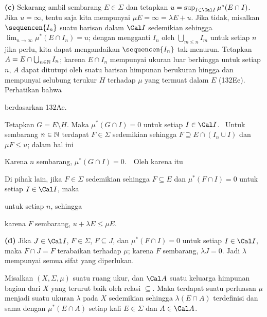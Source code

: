 {\medskip

{\bf (c)} Sekarang ambil sembarang $E\in\Sigma$ dan tetapkan
$u=\sup_{I\in\Cal I}\mu^*(E\cap I)$.   Jika $u=\infty$, tentu saja kita
mempunyai $\mu E=\infty=\lambda E+u$. Jika tidak, misalkan
$\sequencen{I_n}$ suatu barisan dalam $\Cal I$ sedemikian sehingga
$\lim_{n\to\infty}\mu^*(E\cap I_n)=u$; dengan mengganti $I_n$ oleh
$\bigcup_{m\le n}I_m$ untuk setiap $n$ jika perlu, kita dapat mengandaikan
$\sequencen{I_n}$ tak-menurun.   Tetapkan
$A=E\cap\bigcup_{n\in\Bbb N}I_n$; karena $E\cap I_n$ mempunyai ukuran
luar berhingga untuk setiap $n$, $A$ dapat ditutupi oleh suatu barisan
himpunan berukuran hingga dan mempunyai selubung terukur $H$ terhadap
$\mu$ yang termuat dalam $E$ (132Ee).   Perhatikan bahwa


\noindent berdasarkan 132Ae.

Tetapkan $G=E\setminus H$.   Maka $\mu^*(G\cap I)=0$ untuk setiap
$I\in\Cal I$. \Prf\ Untuk sembarang $n\in\Bbb N$ terdapat
$F\in\Sigma$ sedemikian sehingga $F\supseteq E\cap(I_n\cup I)$ dan
$\mu F\le u$; dalam hal ini


\noindent Karena $n$ sembarang, $\mu^*(G\cap I)=0$.\ \QeD\   Oleh karena itu


\noindent Di pihak lain, jika $F\in\Sigma$ sedemikian sehingga
$F\subseteq E$ dan $\mu^*(F\cap I)=0$ untuk setiap $I\in\Cal I$, maka


\noindent untuk setiap $n$, sehingga


\noindent karena $F$ sembarang, $u+\lambda E\le\mu E$.

\medskip

{\bf (d)} Jika $J\in\Cal I$, $F\in\Sigma$, $F\subseteq J$, dan
$\mu^*(F\cap I)=0$ untuk setiap $I\in\Cal I$, maka
$F\cap J=F$ terabaikan terhadap $\mu$; karena $F$ sembarang,
$\lambda J=0$. Jadi $\lambda$ mempunyai semua sifat yang diperlukan.
}%

Misalkan $(X,\Sigma,\mu)$ suatu ruang ukur, dan $\Cal A$ suatu keluarga
himpunan bagian dari $X$ yang terurut baik oleh relasi $\subseteq$.
Maka terdapat suatu perluasan $\mu$ menjadi suatu ukuran $\lambda$ pada
$X$ sedemikian sehingga $\lambda(E\cap A)$ terdefinisi dan sama dengan
$\mu^*(E\cap A)$ setiap kali $E\in\Sigma$ dan $A\in\Cal A$.

